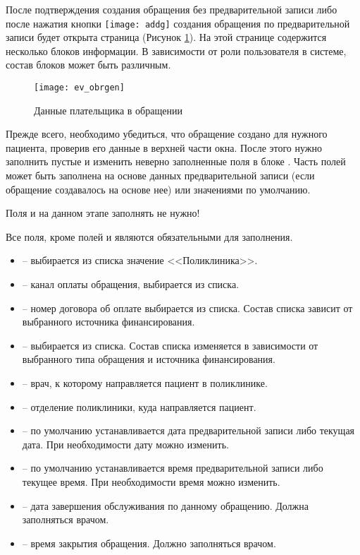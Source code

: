 {После подтверждения создания обращения без предварительной записи либо после нажатия кнопки \texttt{[image: addg]} создания обращения по предварительной записи будет открыта страница  (Рисунок \ref{img_ev_obrgen}). На этой странице содержится несколько блоков информации. В зависимости от роли пользователя в системе, состав блоков может быть различным. 

\begin{figure}[ht]\centering
	\texttt{[image: ev\_obrgen]}
	\caption{Данные плательщика в обращении}
	\label{img_ev_obrgen}
\end{figure}

Прежде всего, необходимо убедиться, что обращение создано для нужного пациента, проверив его данные в верхней части окна. После этого нужно заполнить пустые и изменить неверно заполненные поля в блоке . Часть полей может быть заполнена на основе данных предварительной записи (если обращение создавалось на основе нее) или значениями по умолчанию.

\begin{vnim}
 Поля  и  на данном этапе заполнять не нужно!
\end{vnim}

Все поля, кроме полей  и  являются обязательными для заполнения.
\begin{itemize}
 \item {} -- выбирается из списка значение <<Поликлиника>>.
 \item {} – канал оплаты обращения, выбирается из списка.
 \item {} – номер договора об оплате выбирается из списка. Состав списка зависит от выбранного источника финансирования.
 \item {} – выбирается из списка. Состав списка изменяется в зависимости от выбранного типа обращения и источника финансирования.
 \item {} – врач, к которому направляется пациент в поликлинике.
 \item {} – отделение поликлиники, куда направляется пациент.
 \item {} – по умолчанию устанавливается дата предварительной записи либо текущая дата. При необходимости дату можно изменить.
 \item {} – по умолчанию устанавливается время предварительной записи либо текущее время. При необходимости время можно изменить.
 \item {} – дата завершения обслуживания по данному обращению. Должна заполняться врачом.
 \item {} – время закрытия обращения. Должно заполняться врачом.
\end{itemize}

}
